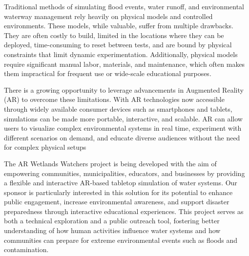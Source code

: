 Traditional methods of simulating flood events, water runoff, and environmental waterway management rely heavily on physical models and controlled environments. These models, while valuable, suffer from multiple drawbacks. They are often costly to build, limited in the locations where they can be deployed, time-consuming to reset between tests, and are bound by physical constraints that limit dynamic experimentation. Additionally, physical models require significant manual labor, materials, and maintenance, which often makes them impractical for frequent use or wide-scale educational purposes.



There is a growing opportunity to leverage advancements in Augmented Reality (AR) to overcome these limitations. With AR technologies now accessible through widely available consumer devices such as smartphones and tablets, simulations can be made more portable, interactive, and scalable. AR can allow users to visualize complex environmental systems in real time, experiment with different scenarios on demand, and educate diverse audiences without the need for complex physical setups

The AR Wetlands Watchers project is being developed with the aim of empowering communities, municipalities, educators, and businesses by providing a flexible and interactive AR-based tabletop simulation of water systems. Our sponsor is particularly interested in this solution for its potential to enhance public engagement, increase environmental awareness, and support disaster preparedness through interactive educational experiences. This project serves as both a technical exploration and a public outreach tool, fostering better understanding of how human activities influence water systems and how communities can prepare for extreme environmental events such as floods and contamination.

